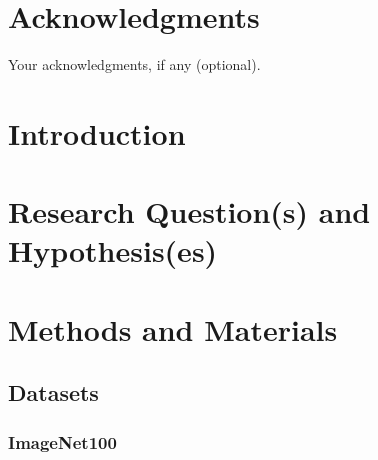 \documentclass[12pt, a4paper]{report}
\begin{document}
\chapter*{Acknowledgments}
Your acknowledgments, if any (optional).
\newpage

\tableofcontents
\newpage

\chapter{Introduction}



\chapter{Research Question(s) and Hypothesis(es)}



\chapter{Methods and Materials}

\section{Datasets}

\subsection{ImageNet100}
\end{document}
